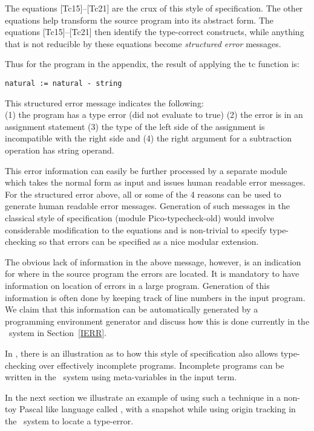 The equations [Tc15]--[Tc21]
are the crux of this style of specification. The other equations
help transform the source program into its abstract form. The
equations [Tc15]--[Tc21] then identify the type-correct
constructs, while anything that is not reducible by these
equations become {\em structured error} messages.

Thus for the program in the appendix, the result of applying
the tc function is:

\begin{verbatim}
natural := natural - string
\end{verbatim}

This structured error message indicates the following:\\
(1) the program has a type error (did not evaluate to true)
(2) the error is in an assignment statement
(3) the type of the left side of the assignment is incompatible
    with the right side
and (4) the right argument for a subtraction operation has string operand.

This error information can easily be further processed by
a separate module which takes the normal form as input
and issues human readable error messages. For the structured error
above, all or some of the 4 reasons can be used to generate 
human readable error messages.
Generation of such messages in the classical style of
specification (module Pico-typecheck-old) would involve
considerable modification to the equations and is non-trivial
to specify type-checking so that errors can be specified
as a nice modular extension.

The obvious lack of information in the above message, 
however, is an indication for where in the source
program the errors are located. 
It is mandatory to have information on location of errors in a large program.
Generation of this information
is often done by keeping track of line numbers in the input program.
We claim that this information can be automatically
generated by a programming environment generator and
discuss how this is done currently in the \asdf\ system
in Section~\ref{IERR}.

In \cite{DT92}, there is an illustration as to  how this
style of specification also allows type-checking
over effectively incomplete programs. Incomplete
programs can be written in the \asdf\ system
using meta-variables in the input term.

In the next section we illustrate an example of 
using such a technique in a non-toy Pascal
like language called \clax, with a snapshot 
while using origin tracking in the \asdf\ system
to locate a type-error.

